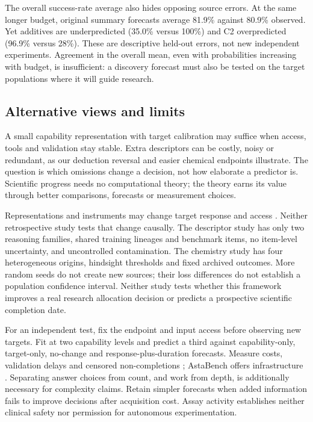 The overall success-rate average also hides opposing source errors. At the same longer budget, original summary forecasts average 81.9\% against 80.9\% observed. Yet additives are underpredicted (35.0\% versus 100\%) and C2 overpredicted (96.9\% versus 28\%). These are descriptive held-out errors, not new independent experiments. Agreement in the overall mean, even with probabilities increasing with budget, is insufficient: a discovery forecast must also be tested on the target populations where it will guide research.

\subsection{Alternative views and limits}
A small capability representation with target calibration may suffice when access, tools and validation stay stable. Extra descriptors can be costly, noisy or redundant, as our deduction reversal and easier chemical endpoints illustrate. The question is which omissions change a decision, not how elaborate a predictor is. Scientific progress needs no computational theory; the theory earns its value through better comparisons, forecasts or measurement choices.

Representations and instruments may change target response and access \citep{ge2026,lourie2025,hernandez2021transfer,longpre2026atlas}. Neither retrospective study tests that change causally. The descriptor study has only two reasoning families, shared training lineages and benchmark items, no item-level uncertainty, and uncontrolled contamination. The chemistry study has four heterogeneous origins, hindsight thresholds and fixed archived outcomes. More random seeds do not create new sources; their loss differences do not establish a population confidence interval. Neither study tests whether this framework improves a real research allocation decision or predicts a prospective scientific completion date.

For an independent test, fix the endpoint and input access before observing new targets. Fit at two capability levels and predict a third against capability-only, target-only, no-change and response-plus-duration forecasts. Measure costs, validation delays and censored non-completions \citep{gneiting2007}; AstaBench offers infrastructure \citep{bragg2026astabench}. Separating answer choices from count, and work from depth, is additionally necessary for complexity claims. Retain simpler forecasts when added information fails to improve decisions after acquisition cost. Assay activity establishes neither clinical safety nor permission for autonomous experimentation.

